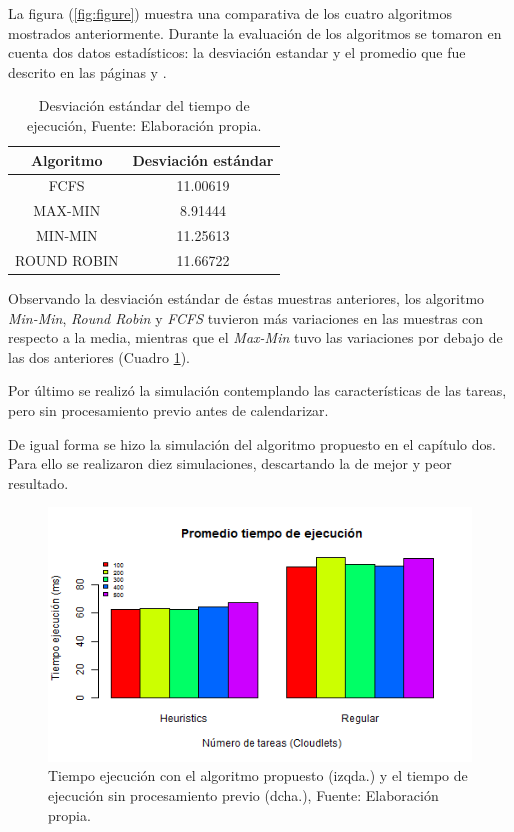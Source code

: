 La figura (\ref{fig:figure}) muestra una comparativa de los cuatro algoritmos mostrados anteriormente. Durante la evaluación de los algoritmos se tomaron en cuenta dos datos estadísticos: la desviación estandar y el promedio que fue descrito en las páginas \pageref{etiqueta} y \pageref{etiqueta2}.



\renewcommand\thetable{\arabic{table}}
\begin{table}[h!]
	\centering
	\begin{tabular}{@{}cc@{}}
		\toprule
		{\bf Algoritmo} & \multicolumn{1}{l}{{\bf Desviaci\'on est\'andar}} \\ \midrule
		FCFS & 11.00619 \\
		MAX-MIN & 8.91444 \\
		MIN-MIN & 11.25613 \\ 
		ROUND ROBIN & 11.66722 \\ \bottomrule
		
	\end{tabular}
	\caption{Desviaci\'on est\'andar del tiempo de ejecuci\'on, Fuente: Elaboraci\'on propia.}
	\label{tiempotabla}
\end{table}

Observando la desviaci\'on est\'andar de \'estas muestras anteriores, los algoritmo \textit{Min-Min}, \textit{Round Robin} y \textit{FCFS} tuvieron m\'as variaciones en las muestras con respecto a la media, mientras que el \textit{Max-Min} tuvo las variaciones por debajo de las dos anteriores (Cuadro \ref{tiempotabla}).


Por último se realizó la simulación contemplando las características de las tareas, pero sin procesamiento previo antes de calendarizar. 

De igual forma se hizo la simulación del algoritmo propuesto en el capítulo dos. Para ello se realizaron diez simulaciones, descartando la de mejor y peor resultado.

\renewcommand\thefigure{\arabic{figure}}
\begin{figure}[h!] 
	\centering
	\includegraphics[scale=0.7]{media/tiempoFinal}
	\caption{Tiempo ejecuci\'on con el algoritmo propuesto (izqda.) y el tiempo de ejecución sin procesamiento previo (dcha.), Fuente: Elaboraci\'on propia.}
	\label{fig:timeF}
\end{figure}

